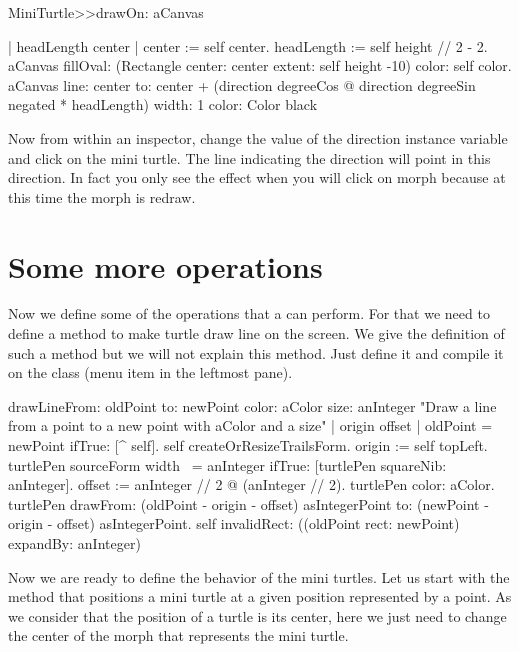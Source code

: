 \begin{method}\label{mth:drawOnthree}
MiniTurtle>>drawOn: aCanvas
   
   | headLength center |
   center := self center.
   headLength := self height // 2 - 2.
   aCanvas 
      fillOval: (Rectangle center: center extent: self height -10)
      color: self color.
   aCanvas
      line: center
      to: center 
            + (direction degreeCos @ direction degreeSin negated 
                 * headLength)
      width: 1
      color: Color black
\end{method}


Now from within an inspector, change the value of the direction
instance variable and click on the mini turtle. The line indicating
the direction will point in this direction. In fact you only see
the effect when you will click on morph because at this time the morph
is redraw. 

\section{Some more operations}
Now we define some of the operations that a \mt can perform.  For that
we need to define a method to make turtle draw line on the screen. We
give the definition of such a method  but we will
not explain this method. Just define it and compile it on the class
 (menu item  in the leftmost pane).

\begin{method}\label{mth:pasteup}
drawLineFrom: oldPoint to: newPoint color: aColor size: anInteger
   "Draw a line from a point to a new point with aColor and a size"
   | origin offset |
   oldPoint = newPoint ifTrue: [^ self].
   self createOrResizeTrailsForm.
   origin := self topLeft.
   turtlePen sourceForm width ~= anInteger
	ifTrue: [turtlePen squareNib: anInteger].
   offset := anInteger // 2 @ (anInteger // 2).
   turtlePen color: aColor.
   turtlePen 
	drawFrom: (oldPoint - origin - offset) asIntegerPoint 
	to: (newPoint - origin - offset) asIntegerPoint.
    self invalidRect: ((oldPoint rect: newPoint) expandBy: anInteger)
\end{method}

Now we are ready to define the behavior of the mini turtles. Let us
start with the  method that positions a mini turtle at a
given position represented by a point. As we consider that the
position of a turtle is its center, here we just need to change the
center of the morph that represents the mini turtle.

